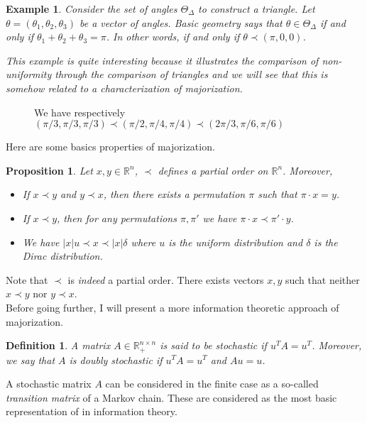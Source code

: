 \documentclass[a4paper]{article}
\newcommand*{\R}{\mathbb{R}}
\newtheorem{definition}{Definition}
\newtheorem{proposition}{Proposition}
\newtheorem{example}{Example}
\begin{document}
\begin{example} Consider the set of angles \(\Theta_\Delta\) to construct a triangle. 
    Let \(\theta = (\theta_1,\theta_2,\theta_3)\) be a vector of angles. Basic geometry 
    says that \(\theta\in \Theta_\Delta\) if and only if \(\theta_1+\theta_2+\theta_3 = \pi\).
    In other words, if and only if \(\theta\prec (\pi,0,0)\).

    This example is quite interesting because it illustrates the comparison of non-uniformity
    through the comparison of triangles and we will see that this is somehow related to a characterization of majorization.
\end{example}
\begin{figure}
    \centering
    \label{fig:trianglemajo}
    \caption{We have respectively \((\pi/3, \pi/3,\pi/3) \prec (\pi/2,\pi/4, \pi/4) \prec (2\pi/3,\pi/6,\pi/6)\)}
\end{figure}
Here are some basics properties of majorization.
\begin{proposition} Let \(x,y\in\R^n\), \(\prec\) defines a partial order on \(\R^n\). Moreover,
    \begin{itemize}
        \item If \(x\prec y\) and \(y\prec x\), then there exists a permutation \(\pi\) such that \(\pi\cdot x = y\).
        \item If \(x\prec y\), then for any permutations \(\pi,\pi'\) we have \(\pi\cdot x\prec \pi'\cdot y\).
        \item We have \(\lvert x\rvert u\prec x \prec \lvert x\rvert\delta\) where \(u\) is the uniform distribution and \(\delta\) is the Dirac distribution.
    \end{itemize}
\end{proposition}
Note that \(\prec\) is \textit{indeed} a partial order. There exists vectors \(x,y\) such that neither \(x\prec y\) nor \(y\prec x\).
\\
Before going further, I will present a more information theoretic approach of majorization.
\begin{definition} A matrix \(A\in\R_+^{n\times n}\) is said to be stochastic if \(u^TA = u^T\).
    Moreover, we say that \(A\) is doubly stochastic if \(u^TA = u^T\) and \(Au = u\).
\end{definition}
A stochastic matrix \(A\) can be considered in the finite case as a so-called \textit{transition matrix} of a Markov chain. 
These are considered as the most basic representation of  in information theory.
\end{document}
